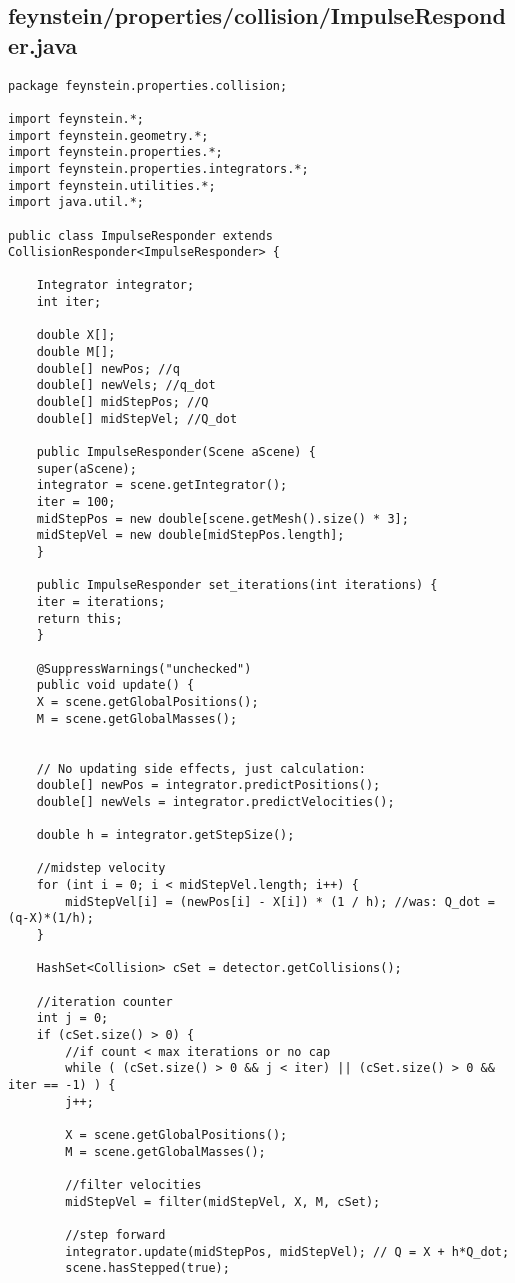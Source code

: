 \subsection*{feynstein/properties/collision/ImpulseResponder.java}
\begin{lstlisting}
package feynstein.properties.collision;

import feynstein.*;
import feynstein.geometry.*;
import feynstein.properties.*;
import feynstein.properties.integrators.*;
import feynstein.utilities.*;
import java.util.*;

public class ImpulseResponder extends CollisionResponder<ImpulseResponder> {

    Integrator integrator;
    int iter;

    double X[];
    double M[];	
    double[] newPos; //q
    double[] newVels; //q_dot
    double[] midStepPos; //Q
    double[] midStepVel; //Q_dot

    public ImpulseResponder(Scene aScene) {
	super(aScene);
	integrator = scene.getIntegrator();
	iter = 100;
	midStepPos = new double[scene.getMesh().size() * 3];
	midStepVel = new double[midStepPos.length];
    }

    public ImpulseResponder set_iterations(int iterations) {
	iter = iterations;
	return this;
    }
    
    @SuppressWarnings("unchecked")
    public void update() {
	X = scene.getGlobalPositions();
	M = scene.getGlobalMasses();
	
	
	// No updating side effects, just calculation:
	double[] newPos = integrator.predictPositions();
	double[] newVels = integrator.predictVelocities();

	double h = integrator.getStepSize();

	//midstep velocity
	for (int i = 0; i < midStepVel.length; i++) {
	    midStepVel[i] = (newPos[i] - X[i]) * (1 / h); //was: Q_dot = (q-X)*(1/h);
	}
	
	HashSet<Collision> cSet = detector.getCollisions();
	
	//iteration counter
	int j = 0;
	if (cSet.size() > 0) {
	    //if count < max iterations or no cap
	    while ( (cSet.size() > 0 && j < iter) || (cSet.size() > 0 && iter == -1) ) {
		j++;
		
		X = scene.getGlobalPositions();
		M = scene.getGlobalMasses();

		//filter velocities
		midStepVel = filter(midStepVel, X, M, cSet);

		//step forward
		integrator.update(midStepPos, midStepVel); // Q = X + h*Q_dot;
		scene.hasStepped(true);


\end{lstlisting}
